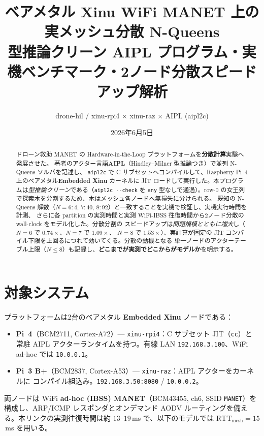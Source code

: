 \documentclass[11pt]{ltjsarticle}
\title{\textbf{ベアメタル Xinu WiFi MANET 上の実メッシュ分散 N-Queens}\\
\large 型推論クリーン AIPL プログラム・実機ベンチマーク・2ノード分散スピードアップ解析}
\author{drone-hil / xinu-rpi4 $\times$ xinu-raz $\times$ AIPL (aipl2c)}
\date{2026年6月5日}
\begin{document}
\maketitle

\begin{abstract}
ドローン救助 MANET の Hardware-in-the-Loop プラットフォームを\textbf{分散計算}実験へ発展させた。
著者のアクター言語\textbf{AIPL}（Hindley--Milner 型推論つき）で並列 N-Queens ソルバを記述し、
\texttt{aipl2c} で C サブセットへコンパイルして、Raspberry Pi~4 上のベアメタル\textbf{Embedded Xinu}
カーネルに JIT ロードして実行した。本プログラムは\emph{型推論クリーン}である（\texttt{aipl2c -{}-check}
を \texttt{any} 型なしで通過）。row-0 の女王列で探索木を分割するため、木はメッシュ各ノードへ無損失に分けられる。
既知の N-Queens 解数（$N{=}6{:}4$, $7{:}40$, $8{:}92$）と一致することを実機で検証し、実機実行時間を計測、
さらに各 partition の実測時間と実測 WiFi-IBSS 往復時間から2ノード分散の wall-clock をモデル化した。分散分割の
スピードアップは\emph{問題規模とともに増大}し（$N{=}6$ で $0.74\times$、$N{=}7$ で $1.09\times$、
$N{=}8$ で $\mathbf{1.53\times}$）、実計算が固定の JIT コンパイル下限を上回るにつれて効いてくる。分散の動機となる
単一ノードのアクターテーブル上限（$N{\le}8$）も記録し、\textbf{どこまでが実測でどこからがモデルか}を明示する。
\end{abstract}

\section{対象システム}
プラットフォームは2台のベアメタル \textbf{Embedded Xinu} ノードである：
\begin{itemize}
  \item \textbf{Pi~4}（BCM2711, Cortex-A72）--- \texttt{xinu-rpi4}：C サブセット JIT（\texttt{cc}）と
  常駐 AIPL アクターランタイムを持つ。有線 LAN \texttt{192.168.3.100}、WiFi ad-hoc では \texttt{10.0.0.1}。
  \item \textbf{Pi~3 B+}（BCM2837, Cortex-A53）--- \texttt{xinu-raz}：AIPL アクターをカーネルに
  コンパイル組込み。\texttt{192.168.3.50:8080} / \texttt{10.0.0.2}。
\end{itemize}
両ノードは WiFi \textbf{ad-hoc (IBSS) MANET}（BCM43455, ch6, SSID \texttt{MANET}）を構成し、ARP/ICMP
レスポンダとオンデマンド AODV ルーティングを備える。本リンクの実測往復時間は約 $13$--$19$\,ms で、以下のモデルでは
$\mathrm{RTT_{mesh}} = 15$\,ms を用いる。
\end{document}
